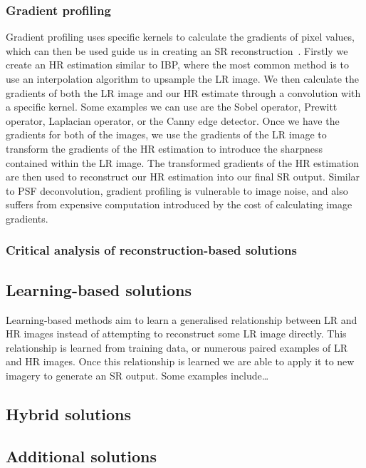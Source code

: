 \subsubsection{Gradient profiling}
Gradient profiling uses specific kernels to calculate the gradients of pixel values, which can then be used guide us in creating an SR reconstruction~\cite{ref}. Firstly we create an HR estimation similar to IBP, where the most common method is to use an interpolation algorithm to upsample the LR image. We then calculate the gradients of both the LR image and our HR estimate through a convolution with a specific kernel. Some examples we can use are the Sobel operator, Prewitt operator, Laplacian operator, or the Canny edge detector. Once we have the gradients for both of the images, we use the gradients of the LR image to transform the gradients of the HR estimation to introduce the sharpness contained within the LR image. The transformed gradients of the HR estimation are then used to reconstruct our HR estimation into our final SR output. Similar to PSF deconvolution, gradient profiling is vulnerable to image noise, and also suffers from expensive computation introduced by the cost of calculating image gradients.

\subsubsection{Critical analysis of reconstruction-based solutions}

\subsection{Learning-based solutions}
Learning-based methods aim to learn a generalised relationship between LR and HR images instead of attempting to reconstruct some LR image directly. This relationship is learned from training data, or numerous paired examples of LR and HR images. Once this relationship is learned we are able to apply it to new imagery to generate an SR output. Some examples include\dots

\subsection{Hybrid solutions}

\subsection{Additional solutions}

